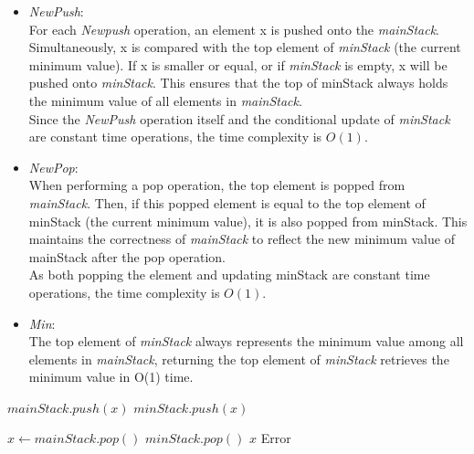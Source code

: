 \documentclass[12pt]{article}
\begin{document}
\begin{itemize}
    \item \textit{NewPush}:\\
    For each \textit{Newpush} operation, an element x is pushed onto the
    \textit{mainStack}. Simultaneously, x is compared with the top 
    element of \textit{minStack} (the current minimum value). If x is smaller or 
    equal, or if \textit{minStack} is empty, x will be pushed onto \textit{minStack}. 
    This ensures that the top of minStack always holds the minimum value 
    of all elements in \textit{mainStack}.\\
    Since the \textit{NewPush} operation itself and the conditional update 
    of \textit{minStack} are constant time operations, the time complexity is $O(1)$.
    
    \item \textit{NewPop}:\\
    When performing a pop operation, the top element is popped from 
    \textit{mainStack}. Then, if this popped element is equal to the top element 
    of minStack (the current minimum value), it is also popped from minStack. 
    This maintains the correctness of \textit{mainStack} to reflect the new 
    minimum value of mainStack after the pop operation.\\
    As both popping the element and updating minStack are constant time operations,
    the time complexity is $O(1)$.

    \item \textit{Min}:\\
    The top element of \textit{minStack} always represents the minimum value 
    among all elements in \textit{mainStack}, returning the top element of 
    \textit{minStack} retrieves the minimum value in O(1) time.
\end{itemize}

\begin{algorithm*}
    \begin{algorithmic}[1]
        \State $mainStack.push(x)$
            \State $minStack.push(x)$
        \EndIf
    \EndFunction
    \end{algorithmic}
\end{algorithm*}
    
\begin{algorithm*}
    \begin{algorithmic}[1]
            \State $x \gets mainStack.pop()$
                \State $minStack.pop()$
            \EndIf
            \State \Return $x$
        \Else
            \State \Return Error 
        \EndIf
    \EndFunction
    \end{algorithmic}
\end{algorithm*}
\end{document}
